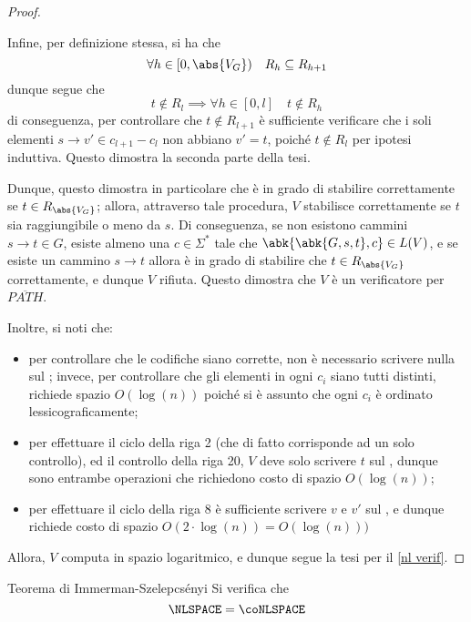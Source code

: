 \documentclass[a4paper, 12pt]{report}
\begin{document}
\begin{proof}
\begin{enumerate}[label=]
                    Infine, per definizione stessa, si ha che $$\forall h \in [0, \abs{V_G}) \quad R_h \subseteq R_{h + 1}$$ dunque segue che $$t \notin R_l \implies \forall h \in [0, l] \quad t \notin R_h$$ di conseguenza, per controllare che $t \notin R_{l + 1}$ è sufficiente verificare che i soli elementi $s \to v' \in c_{l + 1} - c_l$ non abbiano $v' = t$, poiché $t \notin R_l$ per ipotesi induttiva. Questo dimostra la seconda parte della tesi.
            \end{enumerate}

            Dunque, questo dimostra in particolare che  è in grado di stabilire correttamente se $t \in R_{\abs{V_G}}$; allora, attraverso tale procedura, $V$ stabilisce correttamente se $t$ sia raggiungibile o meno da $s$. Di conseguenza, se non esistono cammini $s \to t \in G$, esiste almeno una $c \in \Sigma ^*$ tale che $\abk{\abk{G, s, t}, c} \in L(V)$, e se esiste un cammino $s \to t$ allora  è in grado di stabilire che $t \in R_{\abs{V_G}}$ correttamente, e dunque $V$ rifiuta. Questo dimostra che $V$ è un verificatore per $\overline{PATH}$.

            Inoltre, si noti che:

            \begin{itemize}
                \item per controllare che le codifiche siano corrette, non è necessario scrivere nulla sul ; invece, per controllare che gli elementi in ogni $c_i$ siano tutti distinti, richiede spazio $O(\log(n))$ poiché si è assunto che ogni $c_i$ è ordinato lessicograficamente;
                \item per effettuare il ciclo della riga 2 (che di fatto corrisponde ad un solo controllo), ed il controllo della riga 20, $V$ deve solo scrivere $t$ sul , dunque sono entrambe operazioni che richiedono costo di spazio $O(\log(n))$;
                \item per effettuare il ciclo della riga 8 è sufficiente scrivere $v$ e $v'$ sul , e dunque richiede costo di spazio $O(2 \cdot \log(n)) = O(\log(n)))$
            \end{itemize}

            Allora, $V$ computa in spazio logaritmico, e dunque segue la tesi per il \cref{nl verif}.
    \end{proof}

    \begin{framedthm}{Teorema di Immerman-Szelepcsényi}
        Si verifica che $$\NLSPACE = \coNLSPACE$$
    \end{framedthm}
\end{document}
